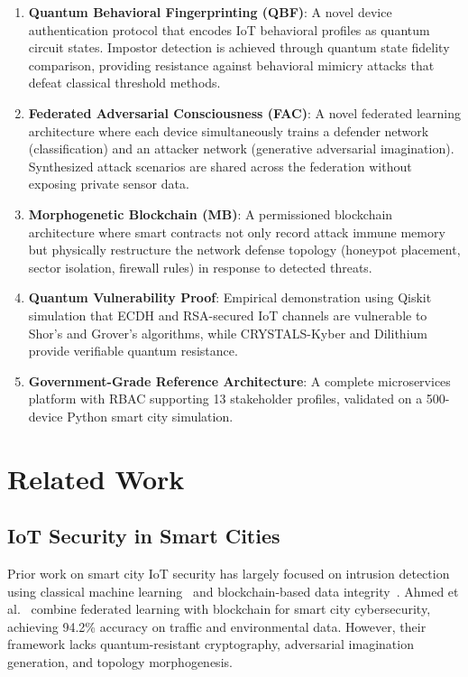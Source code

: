 \documentclass[journal]{IEEEtran}
\begin{document}
\begin{enumerate}
  \item \textbf{Quantum Behavioral Fingerprinting (QBF)}: A novel device
        authentication protocol that encodes IoT behavioral profiles as
        quantum circuit states. Impostor detection is achieved through
        quantum state fidelity comparison, providing resistance against
        behavioral mimicry attacks that defeat classical threshold methods.

  \item \textbf{Federated Adversarial Consciousness (FAC)}: A novel
        federated learning architecture where each device simultaneously
        trains a defender network (classification) and an attacker network
        (generative adversarial imagination). Synthesized attack scenarios
        are shared across the federation without exposing private sensor data.

  \item \textbf{Morphogenetic Blockchain (MB)}: A permissioned blockchain
        architecture where smart contracts not only record attack immune
        memory but physically restructure the network defense topology
        (honeypot placement, sector isolation, firewall rules) in response
        to detected threats.

  \item \textbf{Quantum Vulnerability Proof}: Empirical demonstration using
        Qiskit simulation that ECDH and RSA-secured IoT channels are
        vulnerable to Shor's and Grover's algorithms, while CRYSTALS-Kyber
        and Dilithium provide verifiable quantum resistance.

  \item \textbf{Government-Grade Reference Architecture}: A complete
        microservices platform with RBAC supporting 13 stakeholder profiles,
        validated on a 500-device Python smart city simulation.
\end{enumerate}


\section{Related Work}
\label{sec:related}

\subsection{IoT Security in Smart Cities}
Prior work on smart city IoT security has largely focused on intrusion
detection using classical machine learning~\cite{ref_iot_ids} and
blockchain-based data integrity~\cite{ref_blockchain_iot}. Ahmed et
al.~\cite{ref_blockchain_fl} combine federated learning with blockchain for
smart city cybersecurity, achieving 94.2\% accuracy on traffic and
environmental data. However, their framework lacks quantum-resistant
cryptography, adversarial imagination generation, and topology morphogenesis.
\end{document}
